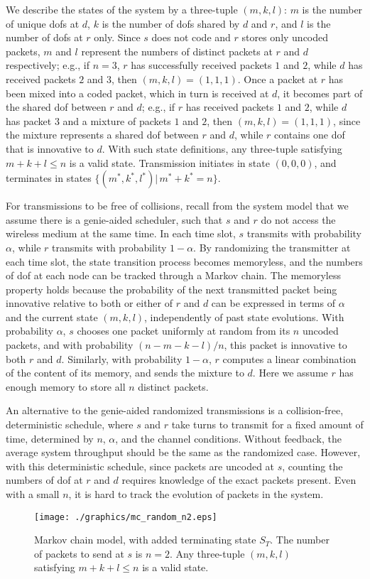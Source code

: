 \documentclass[journal, letterpaper]{IEEEtran}
\begin{document}
We describe the states of the system by a three-tuple $(m,k,l)$: $m$ is the number of unique dofs at $d$, $k$ is the number of dofs shared by $d$ and $r$, and $l$ is the number of dofs at $r$ only. Since $s$ does not code and $r$ stores only uncoded packets, $m$ and $l$ represent the numbers of distinct packets at $r$ and $d$ respectively; e.g., if $n=3$, $r$ has successfully received packets $1$ and $2$, while $d$ has received packets $2$ and $3$, then $(m,k,l)=(1,1,1)$. Once a packet at $r$ has been mixed into a coded packet, which in turn is received at $d$, it becomes part of the shared dof between $r$ and $d$; e.g., if $r$ has received packets $1$ and $2$, while $d$ has packet $3$ and a mixture of packets $1$ and $2$, then $(m,k,l) = (1,1,1)$, since the mixture represents a shared dof between $r$ and $d$, while $r$ contains one dof that is innovative to $d$. With such state definitions, any three-tuple satisfying $m+k+l\leq n$ is a valid state. Transmission initiates in state $(0,0,0)$, and terminates in states $\{(m^*,k^*,l^*)|\,m^*+k^*=n\}$.

For transmissions to be free of collisions, recall from the system model that we assume there is a genie-aided scheduler, such that $s$ and $r$ do not access the wireless medium at the same time. In each time slot, $s$ transmits with probability $\alpha$, while $r$ transmits with probability $1-\alpha$. By randomizing the transmitter at each time slot, the state transition process becomes memoryless, and the numbers of dof at each node can be tracked through a Markov chain. The memoryless property holds because the probability of the next transmitted packet being innovative relative to both or either of $r$ and $d$ can be expressed in terms of $\alpha$ and the current state $(m,k,l)$, independently of past state evolutions. With probability $\alpha$, $s$ chooses one packet uniformly at random from its $n$ uncoded packets, and with probability $(n-m-k-l)/n$, this packet is innovative to both $r$ and $d$. Similarly, with probability $1-\alpha$, $r$ computes a linear combination of the content of its memory, and sends the mixture to $d$. Here we assume $r$ has enough memory to store all $n$ distinct packets.

An alternative to the genie-aided randomized transmissions is a collision-free, deterministic schedule, where $s$ and $r$ take turns to transmit for a fixed amount of time, determined by $n$, $\alpha$, and the channel conditions. Without feedback, the average system throughput should be the same as the randomized case. However, with this deterministic schedule, since packets are uncoded at $s$, counting the numbers of dof at $r$ and $d$ requires knowledge of the exact packets present. Even with a small $n$, it is hard to track the evolution of packets in the system.
\begin{figure}[t!]
  \centering
  \texttt{[image: ./graphics/mc\_random\_n2.eps]}
  \caption{Markov chain model, with added terminating state $S_T$. The number of packets to send at $s$ is $n = 2$. Any three-tuple $(m,k,l)$ satisfying $m+k+l\leq n$ is a valid state.}
  \label{fig:mc_n2}
\end{figure}
\end{document}

